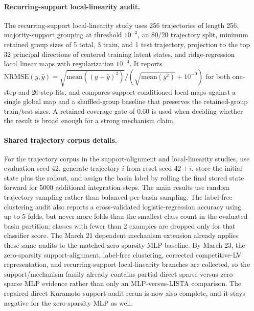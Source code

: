 \paragraph{Recurring-support local-linearity audit.}
The recurring-support local-linearity study uses 256 trajectories of length 256,
majority-support grouping at threshold $10^{-3}$, an 80/20 trajectory split,
minimum retained group sizes of 5 total, 3 train, and 1 test trajectory,
projection to the top 32 principal directions of centered training latent
states, and ridge-regression local linear maps with regularization $10^{-4}$.
It reports
$\mathrm{NRMSE}(y,\hat{y})=\sqrt{\mathrm{mean}((y-\hat{y})^2)}/(\sqrt{\mathrm{mean}(y^2)}+10^{-9})$
for both one-step and 20-step fits, and compares support-conditioned local maps
against a single global map and a shuffled-group baseline that preserves the
retained-group train/test sizes. A retained-coverage gate of 0.60 is used when
deciding whether the result is broad enough for a strong mechanism claim.

\paragraph{Shared trajectory corpus details.}
For the trajectory corpus in the support-alignment and local-linearity studies,
use evaluation seed 42, generate trajectory $i$ from reset seed $42+i$, store
the initial state plus the rollout, and assign the basin label by rolling the
final stored state forward for 5000 additional integration steps. The main
results use random trajectory sampling rather than balanced-per-basin sampling.
The label-free clustering audit also reports a cross-validated
logistic-regression accuracy using up to 5 folds, but never more folds than the
smallest class count in the evaluated basin partition; classes with fewer than
2 examples are dropped only for that classifier score.
The March 21 dependent mechanism extension already applies these same audits to
the matched zero-sparsity MLP baseline. By March 23, the zero-sparsity
support-alignment, label-free clustering, corrected competitive-LV
representation, and recurring-support local-linearity branches are collected,
so the support/mechanism family already contains partial direct
sparse-versus-zero-sparse MLP evidence rather than only an MLP-versus-LISTA
comparison. The repaired direct Kuramoto support-audit rerun is now also
complete, and it stays negative for the zero-sparsity MLP as well.

